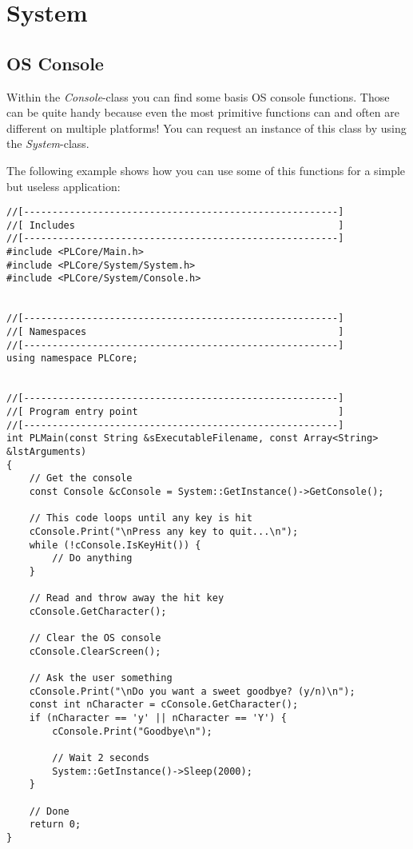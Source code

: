 \section{System}




\subsection{OS Console}
Within the \emph{Console}-class you can find some basis OS console functions. Those can be quite handy because even the most primitive functions can and often are different on multiple platforms! You can request an instance of this class by using the \emph{System}-class.

The following example shows how you can use some of this functions for a simple but useless application:

\begin{lstlisting}[caption=OS console usage example]
//[-------------------------------------------------------]
//[ Includes                                              ]
//[-------------------------------------------------------]
#include <PLCore/Main.h>
#include <PLCore/System/System.h>
#include <PLCore/System/Console.h>


//[-------------------------------------------------------]
//[ Namespaces                                            ]
//[-------------------------------------------------------]
using namespace PLCore;


//[-------------------------------------------------------]
//[ Program entry point                                   ]
//[-------------------------------------------------------]
int PLMain(const String &sExecutableFilename, const Array<String> &lstArguments)
{
	// Get the console
	const Console &cConsole = System::GetInstance()->GetConsole();

	// This code loops until any key is hit
	cConsole.Print("\nPress any key to quit...\n");
	while (!cConsole.IsKeyHit()) {
		// Do anything
	}

	// Read and throw away the hit key
	cConsole.GetCharacter();

	// Clear the OS console
	cConsole.ClearScreen();

	// Ask the user something
	cConsole.Print("\nDo you want a sweet goodbye? (y/n)\n");
	const int nCharacter = cConsole.GetCharacter();
	if (nCharacter == 'y' || nCharacter == 'Y') {
		cConsole.Print("Goodbye\n");

		// Wait 2 seconds
		System::GetInstance()->Sleep(2000);
	}

	// Done
	return 0;
}
\end{lstlisting}
